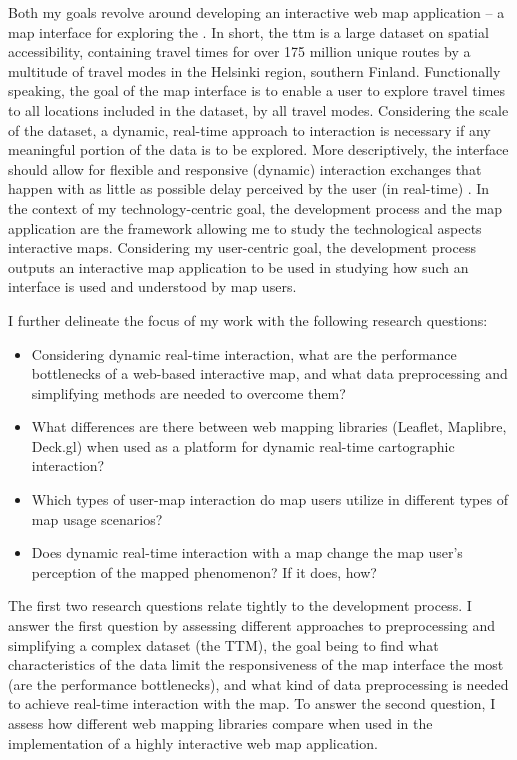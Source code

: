 Both my goals revolve around developing an interactive web map application --
a map interface for exploring the  \parencite{fin2023}.
In short, the \acrshort{ttm} is a large dataset on spatial accessibility,
containing travel times for
over 175 million unique routes by a multitude of travel modes
in the Helsinki region, southern Finland.
Functionally speaking, the goal of the map interface is to enable
a user to explore travel times to all locations included in the dataset,
by all travel modes.
Considering the scale of the dataset,
a dynamic, real-time approach to interaction is necessary
if any meaningful portion of the data is to be explored.
More descriptively, the interface should allow for flexible and
responsive (dynamic) interaction exchanges \parencite{ovi1996, rot2013b}
that happen with as little as possible delay
perceived by the user (in real-time) \parencite{seo2008}.
In the context of my technology-centric goal,
the development process and the map application are the framework
allowing me to study the technological aspects interactive maps.
Considering my user-centric goal,
the development process outputs an interactive map application
to be used in studying how such an interface is used and understood by map users.

I further delineate the focus of my work with the following research questions:

\begin{itemize}
	\item Considering dynamic real-time interaction,
	what are the performance bottlenecks of
	a web-based interactive map,
	and what data preprocessing and simplifying methods
	are needed to overcome them?
	\item What differences are there between web mapping libraries
	(Leaflet, Maplibre, Deck.gl)
	when used as a platform for dynamic real-time cartographic interaction?
	\item Which types of user-map interaction do map users utilize
	in different types of map usage scenarios?
	\item Does dynamic real-time interaction with a map change
	the map user's perception of the mapped phenomenon? If it does, how?
\end{itemize}

The first two research questions relate tightly to the development process.
I answer the first question by assessing different approaches to
preprocessing and simplifying a complex dataset (the TTM),
the goal being to find what characteristics of the data
limit the responsiveness of the map interface the most (are the performance bottlenecks),
and what kind of data preprocessing is needed to achieve real-time interaction with the map.
To answer the second question,
I assess how different web mapping libraries compare when used in the implementation
of a highly interactive web map application.

